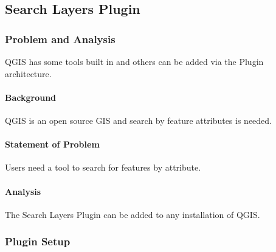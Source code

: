 %
%
%

\subsection{Search Layers Plugin}
\subsubsection{Problem and Analysis}
QGIS has some tools built in and others can be added via the Plugin architecture.
%

\begin{adjmulticols}{2}{\innerMar}{\outerMar}
\paragraph{Background}
QGIS is an open source GIS and search by feature attributes is needed.
\paragraph{Statement of Problem}
Users need a tool to search for features by attribute.
\paragraph{Analysis}
The Search Layers Plugin can be added to any installation of QGIS.
\end{adjmulticols}
\clearpage
\subsubsection{Plugin Setup}
\vspace{.2in}
